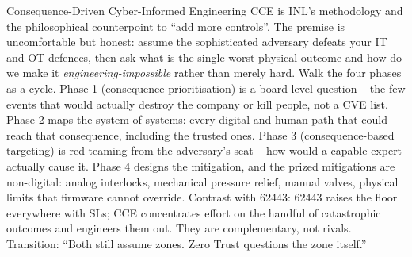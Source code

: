\documentclass[aspectratio=169,11pt]{beamer}
\begin{document}
\begin{frame}{Consequence-Driven Cyber-Informed Engineering}
{  CCE is INL's methodology and the philosophical counterpoint to ``add more controls''. The premise is uncomfortable but honest: assume the sophisticated adversary defeats your IT and OT defences, then ask what is the single worst physical outcome and how do we make it \emph{engineering-impossible} rather than merely hard. Walk the four phases as a cycle. Phase 1 (consequence prioritisation) is a board-level question -- the few events that would actually destroy the company or kill people, not a CVE list. Phase 2 maps the system-of-systems: every digital and human path that could reach that consequence, including the trusted ones. Phase 3 (consequence-based targeting) is red-teaming from the adversary's seat -- how would a capable expert actually cause it. Phase 4 designs the mitigation, and the prized mitigations are non-digital: analog interlocks, mechanical pressure relief, manual valves, physical limits that firmware cannot override. Contrast with 62443: 62443 raises the floor everywhere with SLs; CCE concentrates effort on the handful of catastrophic outcomes and engineers them out. They are complementary, not rivals. Transition: ``Both still assume zones. Zero Trust questions the zone itself.''
}
\end{frame}
\end{document}
